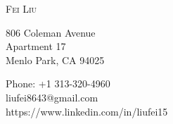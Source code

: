 
\begin{center}

%

\textsc{\Large Fei Liu}\\[0.25cm]

%

\begin{minipage}{0.4\textwidth}
\begin{flushleft}%
806 Coleman Avenue \\
Apartment 17 \\
Menlo Park, CA 94025 \\
\end{flushleft}
\end{minipage}
\begin{minipage}{0.4\textwidth}
\begin{flushright} %
Phone: +1 313-320-4960 \\
liufei8643@gmail.com \\
https://www.linkedin.com/in/liufei15
\end{flushright}
\end{minipage}



\end{center}
